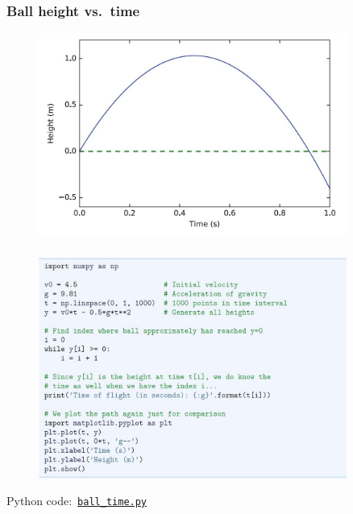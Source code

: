 \documentclass[english,14pt]{beamer}
\begin{document}
\begin{frame}[fragile]

\frametitle{Ball height vs.\ time}

\begin{figure}[ht]
	\centering
	\includegraphics[width=0.9\textwidth]{figures/LLp66output}
\end{figure}

\end{frame}


\begin{frame}[fragile]

\frametitle{}

\begin{figure}[ht]
	\centering
	\includegraphics[width=0.9\textwidth]{figures/LLp65a}
\end{figure}
\vspace*{-3mm}
Python code:~\href{https://github.com/slgit/prog4comp_2/blob/master/py36-src/ball_time.py}{\texttt{ball\_time.py}}

\end{frame}
\end{document}
